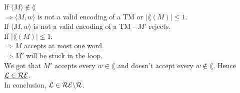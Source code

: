 If $\langle M \rangle \notin \lang$ \\
$\Longrightarrow \langle M, w \rangle$ is not a valid encoding of a TM or $|\lang(M)| \leq 1$. \\
If $\langle M, w \rangle$ is not a valid encoding of a TM - $M'$ rejects. \\
If $|\lang(M)| \leq 1$: \\
$\Longrightarrow M$ accepts at most one word. \\
$\Longrightarrow M'$ will be stuck in the loop. \\

We got that $M'$ accepts every $w \in \lang$ and doesn't accept every $w \notin \lang$. Hence $\underline{\mathcal{L} \in \mathcal{R}\mathcal{E}}$. \\
In conclusion, $\mathcal{L} \in \mathcal{R}\mathcal{E} \backslash \mathcal{R}$. \\

